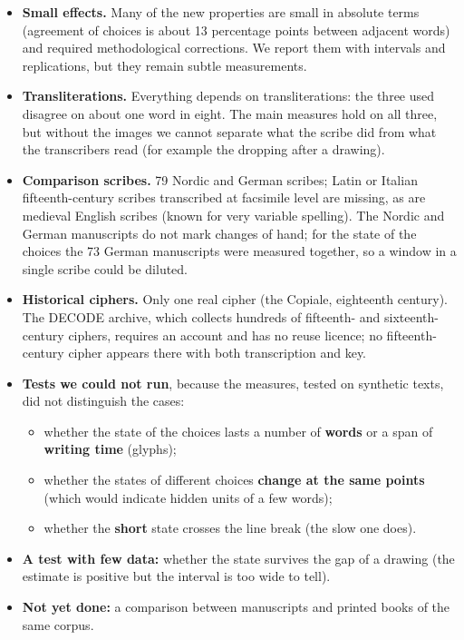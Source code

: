\begin{itemize}
\item \textbf{Small effects.} Many of the new properties are small in absolute terms (agreement of choices is about 13
  percentage points between adjacent words) and required methodological corrections. We report them with intervals and
  replications, but they remain subtle measurements.
\item \textbf{Transliterations.} Everything depends on transliterations: the three used disagree on about one word in
  eight. The main measures hold on all three, but without the images we cannot separate what the scribe did from what the
  transcribers read (for example the  dropping after a drawing).
\item \textbf{Comparison scribes.} 79 Nordic and German scribes; Latin or Italian fifteenth-century scribes transcribed
  at facsimile level are missing, as are medieval English scribes (known for very variable spelling). The Nordic and
  German manuscripts do not mark changes of hand; for the state of the choices the 73 German manuscripts were measured
  together, so a window in a single scribe could be diluted.
\item \textbf{Historical ciphers.} Only one real cipher (the Copiale, eighteenth century). The DECODE archive, which
  collects hundreds of fifteenth- and sixteenth-century ciphers, requires an account and has no reuse licence; no
  fifteenth-century cipher appears there with both transcription and key.
\item \textbf{Tests we could not run}, because the measures, tested on synthetic texts, did not distinguish the cases:
  \begin{itemize}
  \item whether the state of the choices lasts a number of \textbf{words} or a span of \textbf{writing time} (glyphs);
  \item whether the states of different choices \textbf{change at the same points} (which would indicate hidden units of a
    few words);
  \item whether the \textbf{short} state crosses the line break (the slow one does).
  \end{itemize}
\item \textbf{A test with few data:} whether the state survives the gap of a drawing (the estimate is positive but the
  interval is too wide to tell).
\item \textbf{Not yet done:} a comparison between manuscripts and printed books of the same corpus.
\end{itemize}

